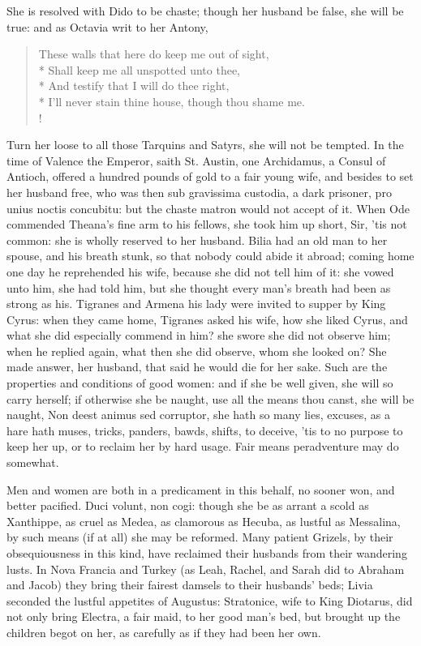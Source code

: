 She is resolved with Dido to be chaste; though her husband be false,
she will be true: and as Octavia writ to her Antony,
%
\begin{verse}%
These walls that here do keep me out of sight,\\*
Shall keep me all unspotted unto thee,\\*
And testify that I will do thee right,\\*
I'll never stain thine house, though thou shame me.\\!
\end{verse}%
%
Turn her loose to all those Tarquins and Satyrs, she will not be
tempted. In the time of Valence the Emperor, saith St. Austin,
one Archidamus, a Consul of Antioch, offered a hundred pounds of gold
to a fair young wife, and besides to set her husband free, who was then
sub gravissima custodia, a dark prisoner, pro unius noctis concubitu:
but the chaste matron would not accept of it. When Ode commended
Theana's fine arm to his fellows, she took him up short, Sir, 'tis not
common: she is wholly reserved to her husband. Bilia had an old
man to her spouse, and his breath stunk, so that nobody could abide it
abroad; coming home one day he reprehended his wife, because she did
not tell him of it: she vowed unto him, she had told him, but she
thought every man's breath had been as strong as his. Tigranes
and Armena his lady were invited to supper by King Cyrus: when they
came home, Tigranes asked his wife, how she liked Cyrus, and what she
did especially commend in him? she swore she did not observe him; when
he replied again, what then she did observe, whom she looked on? She
made answer, her husband, that said he would die for her sake. Such are
the properties and conditions of good women: and if she be well given,
she will so carry herself; if otherwise she be naught, use all the
means thou canst, she will be naught, Non deest animus sed corruptor,
she hath so many lies, excuses, as a hare hath muses, tricks, panders,
bawds, shifts, to deceive, 'tis to no purpose to keep her up, or to
reclaim her by hard usage. Fair means peradventure may do somewhat.

  Men and women are both in a
predicament in this behalf, no sooner won, and better pacified. Duci
volunt, non cogi: though she be as arrant a scold as Xanthippe, as
cruel as Medea, as clamorous as Hecuba, as lustful as Messalina, by
such means (if at all) she may be reformed. Many patient Grizels,
by their obsequiousness in this kind, have reclaimed their husbands
from their wandering lusts. In Nova Francia and Turkey (as Leah,
Rachel, and Sarah did to Abraham and Jacob) they bring their fairest
damsels to their husbands' beds; Livia seconded the lustful appetites
of Augustus: Stratonice, wife to King Diotarus, did not only bring
Electra, a fair maid, to her good man's bed, but brought up the
children begot on her, as carefully as if they had been her own.

